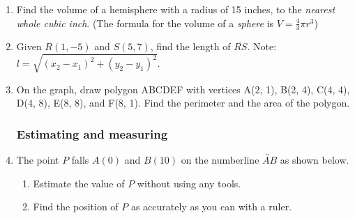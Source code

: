 \documentclass[12pt, twoside]{article}
\begin{document}
\begin{enumerate}
\newpage
  \item Find the volume of a hemisphere with a radius of 15 inches, to the \emph{nearest whole cubic inch}. (The formula for the volume of a \emph{sphere} is $V=\frac{4}{3}\pi r^3$) \vspace{5cm}

  \item Given $R(1,-5)$ and $S(5,7)$, find the length of $\overline{RS}$. Note: $l=\sqrt{(x_2-x_1)^2+(y_2-y_1)^2}$. \vspace{4cm}

  \item On the graph, draw polygon ABCDEF with vertices A(2, 1), B(2, 4), C(4, 4), D(4, 8), E(8, 8), and F(8, 1). Find the perimeter and the area of the polygon.\\[1cm]
  \vspace{2cm}

\newpage
\subsubsection*{Estimating and measuring}
  \item The point $P$ falls $A(0)$ and $B(10)$ on the numberline $\overleftrightarrow{AB}$ as shown below. \\[15pt] %
  \begin{enumerate}
    \item Estimate the value of $P$ without using any tools. \vspace{1cm} 
    \item Find the position of $P$ as accurately as you can with a ruler. 
  \end{enumerate} \vspace{1cm} 


\end{enumerate}
\end{document}
